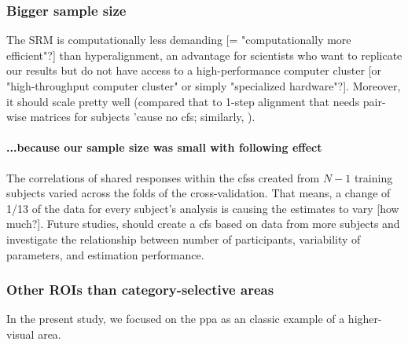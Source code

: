 \subsubsection{Bigger sample size}
%
The SRM is computationally less demanding [= "computationally more efficient"?]
than hyperalignment, an advantage for scientists who want to replicate our
results but do not have access to a high-performance computer cluster [or
"high-throughput computer cluster" or simply "specialized hardware"?].
%
Moreover, it should scale pretty well (compared that to
\citep{jiahui2020predicting} 1-step alignment that needs pair-wise matrices for
subjects 'cause no \ac{cfs}; similarly, \citep{busch2021hybrid}).


\paragraph{...because our sample size was small with following effect}



The correlations of shared responses within the \acp{cfs} created from $N-1$
training subjects varied across the folds of the cross-validation.
That means, a change of 1/13 of the data for every subject's analysis is causing
the estimates to vary [how much?].
Future studies, should create a \ac{cfs} based on data from more subjects and
investigate the relationship between number of participants, variability of
parameters, and estimation performance.



\subsubsection{Other ROIs than category-selective areas}

%
In the present study, we focused on the \ac{ppa} as an classic example of a
higher-visual area.


